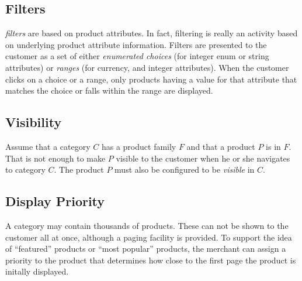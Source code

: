 \documentclass[letterpaper, 12pt]{article}
\begin{document}
\subsection{Filters}
\textit{filters} are based on product attributes.  In fact, filtering is really an activity based on underlying product attribute information.  Filters are presented to the customer as a set of either \textit{enumerated choices} (for integer enum or string attributes) or \textit{ranges} (for currency, and integer attributes).  When the customer clicks on a choice or a range, only products having a value for that attribute that matches the choice or falls within the range are displayed.

\subsection{Visibility}
Assume that a category $C$ has a product family $F$ and that a product $P$ is in $F$.  That is not enough to make $P$ visible to the customer when he or she navigates to category $C$.  The product $P$ must also be configured to be {\em visible} in $C$.

\subsection{Display Priority}
A category may contain thousands of products.  These can not be shown to the customer all at once, although a paging facility is provided.  To support the idea of ``featured'' products or ``most popular'' products, the merchant can assign a priority to the product that determines how close to the first page the product is initally displayed.
\end{document}
